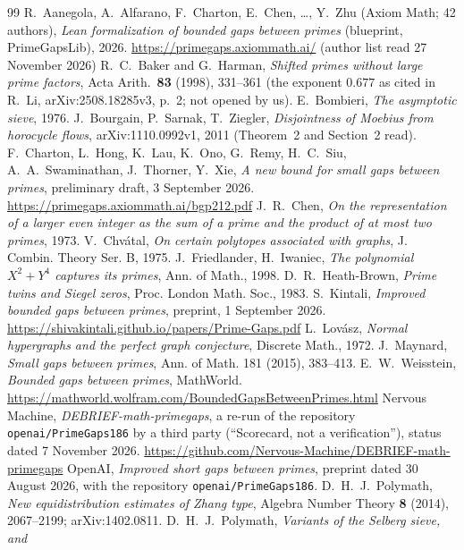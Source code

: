 \documentclass[11pt]{amsart}
\theoremstyle{definition}
\theoremstyle{remark}
\begin{document}
\begin{thebibliography}{99}
 R.~Aanegola, A.~Alfarano, F.~Charton, E.~Chen, \dots, Y.~Zhu (Axiom Math; 42 authors),
\emph{Lean formalization of bounded gaps between primes} (blueprint, PrimeGapsLib), 2026.
\url{https://primegaps.axiommath.ai/} (author list read 27 November 2026)
 R.~C.~Baker and G.~Harman, \emph{Shifted primes without large
prime factors}, Acta Arith.\ \textbf{83} (1998), 331--361 (the exponent $0.677$
as cited in R.~Li, arXiv:2508.18285v3, p.~2; not opened by us).
 E.~Bombieri, \emph{The asymptotic sieve}, 1976.
 J.~Bourgain, P.~Sarnak, T.~Ziegler, \emph{Disjointness of Moebius from horocycle flows},
arXiv:1110.0992v1, 2011 (Theorem~2 and Section~2 read).
 F.~Charton, L.~Hong, K.~Lau, K.~Ono, G.~Remy, H.~C.~Siu,
A.~A.~Swaminathan, J.~Thorner, Y.~Xie, \emph{A new bound for small gaps
between primes}, preliminary draft, 3 September 2026.
\url{https://primegaps.axiommath.ai/bgp212.pdf}
 J.~R.~Chen, \emph{On the representation of a larger even
integer as the sum of a prime and the product of at most two primes}, 1973.
 V.~Chv\'atal, \emph{On certain polytopes associated with
graphs}, J. Combin. Theory Ser. B, 1975.
 J.~Friedlander, H.~Iwaniec, \emph{The polynomial $X^2+Y^4$
captures its primes}, Ann. of Math., 1998.
 D.~R.~Heath-Brown, \emph{Prime twins and Siegel zeros}, Proc.
London Math. Soc., 1983.
 S.~Kintali, \emph{Improved bounded gaps between primes},
preprint, 1 September 2026.
\url{https://shivakintali.github.io/papers/Prime-Gaps.pdf}
 L.~Lov\'asz, \emph{Normal hypergraphs and the perfect graph
conjecture}, Discrete Math., 1972.
 J.~Maynard, \emph{Small gaps between primes}, Ann. of Math.
181 (2015), 383--413.
 E.~W.~Weisstein, \emph{Bounded gaps between primes}, MathWorld.
\url{https://mathworld.wolfram.com/BoundedGapsBetweenPrimes.html}
 Nervous Machine, \emph{DEBRIEF-math-primegaps}, a re-run of
the repository \texttt{openai/PrimeGaps186} by a third party (``Scorecard, not
a verification''), status dated 7 November 2026.
\url{https://github.com/Nervous-Machine/DEBRIEF-math-primegaps}
 OpenAI, \emph{Improved short gaps between primes}, preprint
dated 30 August 2026, with the repository \texttt{openai/PrimeGaps186}.
 D.~H.~J.~Polymath, \emph{New equidistribution estimates of Zhang type}, Algebra Number Theory \textbf{8} (2014), 2067--2199; arXiv:1402.0811.
 D.~H.~J.~Polymath, \emph{Variants of the Selberg sieve, and
}
\end{thebibliography}
\end{document}

